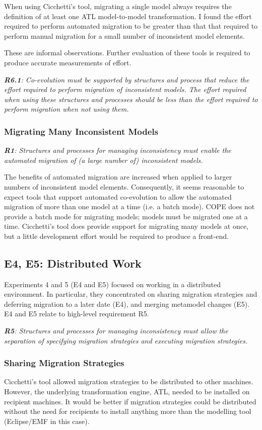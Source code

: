 \documentclass[a4paper]{article}
\begin{document}
When using Cicchetti's tool, migrating a single model always requires the definition of at least one ATL model-to-model transformation. I found the effort required to perform automated migration to be greater than that that required to perform manual migration for a small number of inconsistent model elements.

These are informal observations. Further evaluation of these tools is required to produce accurate measurements of effort.

\emph{\textbf{R6.1}: Co-evolution must be supported by structures and process that reduce the effort required to perform migration of inconsistent models. The effort required when using these structures and processes should be less than the effort required to perform migration when not using them.}


\subsubsection{Migrating Many Inconsistent Models}

\emph{\textbf{R1}: Structures and processes for managing inconsistency must enable the automated migration of (a large number of) inconsistent models.}

The benefits of automated migration are increased when applied to larger numbers of inconsistent model elements. Consequently, it seems reasonable to expect tools that support automated co-evolution to allow the automated migration of more than one model at a time (i.e. a batch mode). COPE does not provide a batch mode for migrating models; models must be migrated one at a time. Cicchetti's tool does provide support for migrating many models at once, but a little development effort would be required to produce a front-end.


\subsection{E4, E5: Distributed Work}
Experiments 4 and 5 (E4 and E5) focused on working in a distributed environment. In particular, they concentrated on sharing migration strategies and deferring migration to a later date (E4), and merging metamodel changes (E5). E4 and E5 relate to high-level requirement R5.

\emph{\textbf{R5}: Structures and processes for managing inconsistency must allow the separation of specifying migration strategies and executing migration strategies.}

\subsubsection{Sharing Migration Strategies}
Cicchetti's tool allowed migration strategies to be distributed to other machines. However, the underlying transformation engine, ATL, needed to be installed on recipient machines. It would be better if migration strategies could be distributed without the need for recipients to install anything more than the modelling tool (Eclipse/EMF in this case).
\end{document}
